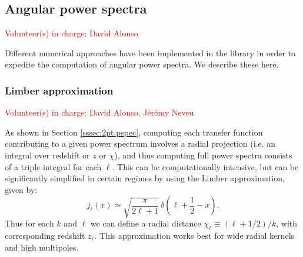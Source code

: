 \documentclass[\docopts]{\docclass}
\newcommand{\vol}[1]{\textcolor{red}{Volunteer(s) in charge: #1}}
\begin{document}



\subsection{Angular power spectra}
\vol{David Alonso}

Different numerical approaches have been implemented in the library in order to expedite the computation of angular power spectra. We describe these here.

\subsubsection{Limber approximation}
\vol{David Alonso, J\'er\'emy Neveu}

As shown in Section \ref{sssec:2pt.pspec}, computing each transfer function contributing to a given power spectrum involves a radial projection (i.e. an integral over redshift or $z$ or $\chi$), and thus computing full power spectra consists of a triple integral for each $\ell$. This can be computationally intensive, but can be significantly simplified in certain regimes by using the Limber approximation, given by:
\begin{equation}
 j_\ell(x)\simeq\sqrt{\frac{\pi}{2\ell+1}}\,\delta\left(\ell+\frac{1}{2}-x\right).
\end{equation}
Thus for each $k$ and $\ell$ we can define a radial distance $\chi_\ell\equiv(\ell+1/2)/k$, with corresponding redshift $z_\ell$. This approximation works best for wide radial kernels and high multipoles.
\end{document}
